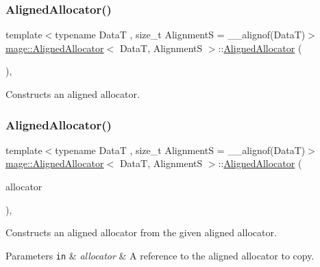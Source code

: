 \subsubsection{\texorpdfstring{Aligned\+Allocator()}{AlignedAllocator()}\hspace{0.1cm}{\footnotesize\ttfamily [1/4]}}
{\footnotesize\ttfamily template$<$typename DataT , size\+\_\+t AlignmentS = \+\_\+\+\_\+alignof(\+Data\+T)$>$ \\
\hyperlink{structmage_1_1_aligned_allocator}{mage\+::\+Aligned\+Allocator}$<$ DataT, AlignmentS $>$\+::\hyperlink{structmage_1_1_aligned_allocator}{Aligned\+Allocator} (\begin{DoxyParamCaption}{ }\end{DoxyParamCaption})\hspace{0.3cm}{\ttfamily [default]}, {\ttfamily [noexcept]}}

Constructs an aligned allocator. \hypertarget{structmage_1_1_aligned_allocator_a57a8626271cc5bb8798201afb499dce7}{}\label{structmage_1_1_aligned_allocator_a57a8626271cc5bb8798201afb499dce7} 
\subsubsection{\texorpdfstring{Aligned\+Allocator()}{AlignedAllocator()}\hspace{0.1cm}{\footnotesize\ttfamily [2/4]}}
{\footnotesize\ttfamily template$<$typename DataT , size\+\_\+t AlignmentS = \+\_\+\+\_\+alignof(\+Data\+T)$>$ \\
\hyperlink{structmage_1_1_aligned_allocator}{mage\+::\+Aligned\+Allocator}$<$ DataT, AlignmentS $>$\+::\hyperlink{structmage_1_1_aligned_allocator}{Aligned\+Allocator} (\begin{DoxyParamCaption}\item[{const \hyperlink{structmage_1_1_aligned_allocator}{Aligned\+Allocator}$<$ DataT, AlignmentS $>$ \&}]{allocator }\end{DoxyParamCaption})\hspace{0.3cm}{\ttfamily [default]}, {\ttfamily [noexcept]}}

Constructs an aligned allocator from the given aligned allocator.


\begin{DoxyParams}[1]{Parameters}
\mbox{\tt in}  & {\em allocator} & A reference to the aligned allocator to copy. \\
\hline
\end{DoxyParams}
\hypertarget{structmage_1_1_aligned_allocator_aa83ac0904d3354ed96a92f7ad713e1a7}{}\label{structmage_1_1_aligned_allocator_aa83ac0904d3354ed96a92f7ad713e1a7} 
